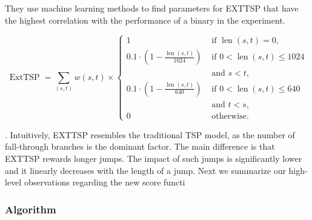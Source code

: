 They use machine learning methods to find parameters for EXTTSP
that have the highest correlation with the performance of
a binary in the experiment. 



$$
\operatorname{ExtTSP}=\sum_{(s, t)} w(s, t) \times \begin{cases}1 & \text { if } \operatorname{len}(s, t)=0, \\ 0.1 \cdot\left(1-\frac{\operatorname{len}(s, t)}{1024}\right) & \text { if } 0<\operatorname{len}(s, t) \leq 1024 \\ & \text { and } s<t, \\ 0.1 \cdot\left(1-\frac{\operatorname{len}(s, t)}{640}\right) & \text { if } 0<\operatorname{len}(s, t) \leq 640 \\ & \text { and } t<s, \\ 0 & \text { otherwise. }\end{cases}
$$

.
Intuitively, EXTTSP resembles the traditional TSP
model, as the number of fall-through branches is the dominant factor. The main difference is that EXTTSP rewards
longer jumps. The impact of such jumps is significantly
lower and it linearly decreases with the length of a jump.
Next we summarize our high-level observations regarding
the new score functi

\subsubsection{Algorithm}

